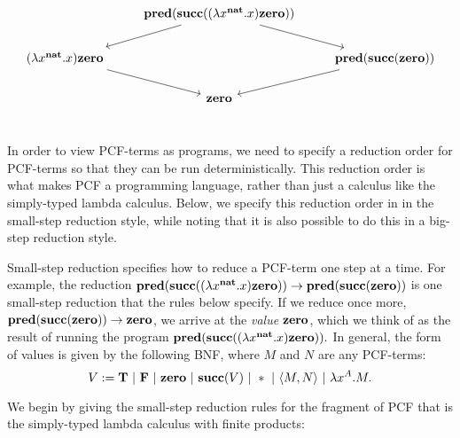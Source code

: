 \[
\begin{tikzcd}[ampersand replacement=\&]
\& \mathbf{pred} (\mathbf{succ} ((\lambda x^{\textbf{nat}}.x)\mathbf{zero})) \ar[ld] \ar[rd]\& \\
(\lambda x^{\textbf{nat}}.x)\textbf{zero} \ar[rd] \& \& \textbf{pred} ( \textbf{succ} (\mathbf{zero})) \ar[ld] \\
\& \textbf{zero} \& \\
\end{tikzcd}
\]

In order to view PCF-terms as programs, we need to specify a reduction order for PCF-terms so that they can be run deterministically. This reduction order is what makes PCF a programming language, rather than just a calculus like the simply-typed lambda calculus. Below, we specify this reduction order in in the small-step reduction style, while noting that it is also possible to do this in a big-step reduction style.


Small-step reduction specifies how to reduce a PCF-term one step at a time. For example, the reduction $\textbf{pred}(\textbf{succ}((\lambda x^{\textbf{nat}}.x)\textbf{zero})) \to \textbf{pred}(\textbf{succ}(\textbf{zero}))$ is one small-step reduction that the rules below specify. If we reduce once more, $\textbf{pred}(\textbf{succ}(\textbf{zero})) \to \textbf{zero}$, we arrive at the \textit{value} $\textbf{zero}$, which we think of as the result of running the program $\textbf{pred}(\textbf{succ}((\lambda x^{\textbf{nat}}.x)\textbf{zero})).$ In general, the form of values is given by the following BNF, where $M$ and $N$ are any PCF-terms:
$$ V := \textbf{T} \ \mathbf{|}\  \textbf{F} \ \mathbf{|}\  \textbf{zero} \ \mathbf{|}\  \textbf{succ}(V) \ \mathbf{|}\  * \ \mathbf{|}\  \langle M,N \rangle \ \mathbf{|}\  \lambda x^A.M.$$

We begin by giving the small-step reduction rules for the fragment of PCF that is the simply-typed lambda calculus with finite products:

